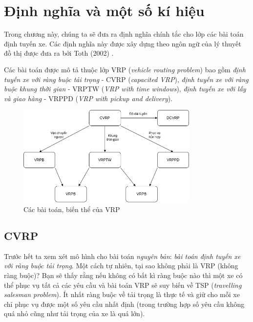 \chapter{Định nghĩa và một số kí hiệu}
Trong chương này, chúng ta sẽ đưa ra định nghĩa chính tắc cho lớp các bài toán định tuyến xe. Các định nghĩa này được xây dựng theo ngôn ngữ của lý thuyết đồ thị được đưa ra bởi Toth (2002) \cite{toth2002vehicle}. 

Các bài toán được mô tả thuộc lớp VRP (\textit{vehicle routing problem}) bao gồm \textit{định tuyến xe với ràng buộc tải trọng} - CVRP (\textit{capacited VRP}), \textit{định tuyến xe với ràng buộc khung thời gian} - VRPTW (\textit{VRP with time windows}), \textit{định tuyến xe với lấy và giao hàng} - VRPPD (\textit{VRP with pickup and delivery}).

\begin{figure}[H] %
  \centering %
  \includegraphics[width=0.8\textwidth]{figures/vrp.png} 
  \caption{Các bài toán, biến thể của VRP} %
  \label{fig:fg_01}
\end{figure}

\section{CVRP}

Trước hết ta xem xét mô hình cho bài toán \textit{nguyên bản}: \textit{bài toán định tuyến xe với ràng buộc tải trọng}. Một cách tự nhiên, tại sao không phải là VRP (không ràng buộc)? Bạn sẽ thấy rằng nếu không có bất kì ràng buộc nào thì một xe có thể phục vụ tất cả các yêu cầu và bài toán VRP sẽ suy biến về TSP (\textit{travelling salesman problem}). Ít nhất ràng buộc về tải trọng là thực tế và giữ cho mỗi xe chỉ phục vụ được một số yêu cầu nhất định (trong trường hợp số yêu cầu không quá nhỏ cũng như tải trọng của xe là quá lớn). 


